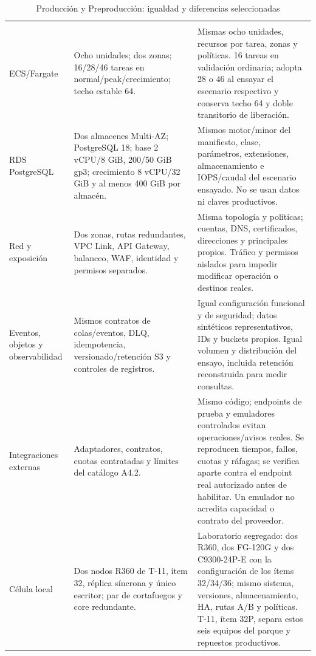 \begingroup\setlength{\tabcolsep}{3pt}
\begin{longtable}{L{\dimexpr.20\tabcolsep\relax}L{\dimexpr.38\tabcolsep\relax}L{\dimexpr.42\tabcolsep\relax}}
\caption{Producción y Preproducción: igualdad y diferencias seleccionadas}\label{tab:preprod-equivalencia}\\\hline
{} &  & \\\hline\endfirsthead
\hline{} &  & \\\hline\endhead
ECS/Fargate & Ocho unidades; dos zonas; 16/28/46 tareas en normal/peak/crecimiento; techo estable 64. & Mismas ocho unidades, recursos por tarea, zonas y políticas. 16 tareas en validación ordinaria; adopta 28 o 46 al ensayar el escenario respectivo y conserva techo 64 y doble transitorio de liberación.\\\hline
RDS PostgreSQL & Dos almacenes Multi-AZ; PostgreSQL 18; base 2 vCPU/8 GiB, 200/50 GiB gp3; crecimiento 8 vCPU/32 GiB y al menos 400 GiB por almacén. & Mismos motor/minor del manifiesto, clase, parámetros, extensiones, almacenamiento e IOPS/caudal del escenario ensayado. No se usan datos ni claves productivos.\\\hline
Red y exposición & Dos zonas, rutas redundantes, VPC Link, API Gateway, balanceo, WAF, identidad y permisos separados. & Misma topología y políticas; cuentas, DNS, certificados, direcciones y principales propios. Tráfico y permisos aislados para impedir modificar operación o destinos reales.\\\hline
Eventos, objetos y observabilidad & Mismos contratos de colas/eventos, DLQ, idempotencia, versionado/retención S3 y controles de registros. & Igual configuración funcional y de seguridad; datos sintéticos representativos, IDs y buckets propios. Igual volumen y distribución del ensayo, incluida retención reconstruida para medir consultas.\\\hline
Integraciones externas & Adaptadores, contratos, cuotas contratadas y límites del catálogo A4.2. & Mismo código; endpoints de prueba y emuladores controlados evitan operaciones/avisos reales. Se reproducen tiempos, fallos, cuotas y ráfagas; se verifica aparte contra el endpoint real autorizado antes de habilitar. Un emulador no acredita capacidad o contrato del proveedor.\\\hline
Célula local & Dos nodos R360 de T-11, ítem 32, réplica síncrona y único escritor; par de cortafuegos y core redundante. & Laboratorio segregado: dos R360, dos FG-120G y dos C9300-24P-E con la configuración de los ítems 32/34/36; mismo sistema, versiones, almacenamiento, HA, rutas A/B y políticas. T-11, ítem 32P, separa estos seis equipos del parque y repuestos productivos.\\\hline

\end{longtable}
